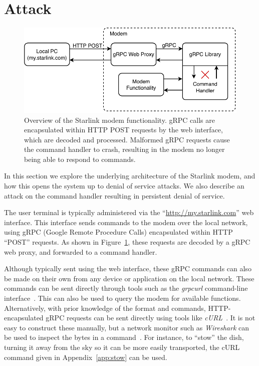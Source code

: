 \section{Attack}\label{sec:attack}

\begin{figure}
    \centering\includegraphics[width=\columnwidth]{img/modem.pdf}
    \caption{Overview of the Starlink modem functionality. gRPC calls are encapsulated within HTTP POST requests by the web interface, which are decoded and processed. Malformed gRPC requests cause the command handler to crash, resulting in the modem no longer being able to respond to commands.}
    \label{fig:modem}
\end{figure}

In this section we explore the underlying architecture of the Starlink modem, and how this opens the system up to denial of service attacks.
We also describe an attack on the command handler resulting in persistent denial of service.

The user terminal is typically administered via the ``\url{http://my.starlink.com}'' web interface.
This interface sends commands to the modem over the local network, using gRPC (Google Remote Procedure Calls) encapsulated within HTTP ``POST'' requests.
As shown in Figure~\ref{fig:modem}, these requests are decoded by a gRPC web proxy, and forwarded to a command handler.

Although typically sent using the web interface, these gRPC commands can also be made on their own from any device or application on the local network.
These commands can be sent directly through tools such as the \textit{grpcurl} command-line interface~\cite{gRPCurl}.
This can also be used to query the modem for available functions.
Alternatively, with prior knowledge of the format and commands, HTTP-encapsulated gRPC requests can be sent directly using tools like \textit{cURL}~\cite{cURL}.
It is not easy to construct these manually, but a network monitor such as \textit{Wireshark} can be used to inspect the bytes in a command~\cite{wireshark}.
For instance, to ``stow'' the dish, turning it away from the sky so it can be more easily transported, the cURL command given in Appendix~\ref{app:stow} can be used.

